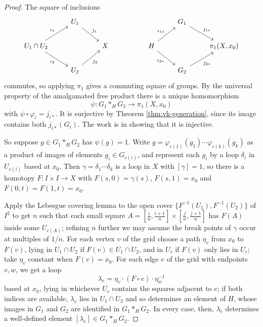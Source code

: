 \documentclass[a4paper]{scrartcl}
\begin{document}
\begin{proof}
	The square of inclusions
	\[\begin{tikzcd}
		& {U_1} \arrow[rd, "{j_1}"] & & & & {G_1} \arrow[rd, "{j_{1*}}"] & \\
		{U_1\cap U_2} \arrow[ru, "{\iota_1}"] \arrow[rd, "{\iota_2}"'] & & X & & H \arrow[ru, "{\iota_{1*}}"] \arrow[rd, "{\iota_{2*}}"'] & & {\pi_1(X,x_0)} \\
		& {U_2} \arrow[ru, "{j_2}"'] & & & & {G_2} \arrow[ru, "{j_{2*}}"'] &
	\end{tikzcd}\]
	commutes, so applying $\pi_1$ gives a commuting square of groups. By the universal property of the amalgamated free product there is a unique homomorphism
	$$
	\psi: G_1 *_H G_2 \to \pi_1(X, x_0)
	$$
	with $\psi \circ \varphi_i = j_{i*}$. It is surjective by Theorem \ref{thm:vk-generation}, since its image contains both $j_{i*}(G_i)$. The work is in showing that it is injective.

	So suppose $g \in G_1 *_H G_2$ has $\psi(g) = 1$. Write $g = \varphi_{c(1)}(g_1)\cdots\varphi_{c(k)}(g_k)$ as a product of images of elements $g_i \in G_{c(i)}$, and represent each $g_i$ by a loop $\delta_i$ in $U_{c(i)}$ based at $x_0$. Then $\gamma = \delta_1 \cdots \delta_k$ is a loop in $X$ with $[\gamma] = 1$, so there is a homotopy $F: I \times I \to X$ with $F(s, 0) = \gamma(s)$, $F(s,1) = x_0$ and $F(0,t) = F(1,t) = x_0$.

	Apply the Lebesgue covering lemma to the open cover $\{F^{-1}(U_1), F^{-1}(U_2)\}$ of $I^2$ to get $n$ such that each small square $A = [\frac{i}{n},\frac{i+1}{n}]\times[\frac{j}{n},\frac{j+1}{n}]$ has $F(A)$ inside some $U_{c(A)}$; refining $n$ further we may assume the break points of $\gamma$ occur at multiples of $1/n$. For each vertex $v$ of the grid choose a path $\eta_v$ from $x_0$ to $F(v)$, lying in $U_1 \cap U_2$ if $F(v) \in U_1\cap U_2$, and in $U_{c}$ if $F(v)$ only lies in $U_{c}$; take $\eta_v$ constant when $F(v) = x_0$. For each edge $e$ of the grid with endpoints $v, w$, we get a loop
	$$
	\lambda_e = \eta_v \cdot (F\circ e)\cdot \eta_w^{-1}
	$$
	based at $x_0$, lying in whichever $U_c$ contains the squares adjacent to $e$; if both indices are available, $\lambda_e$ lies in $U_1 \cap U_2$ and so determines an element of $H$, whose images in $G_1$ and $G_2$ are identified in $G_1 *_H G_2$. In every case, then, $\lambda_e$ determines a well-defined element $[\lambda_e] \in G_1 *_H G_2$.


\end{proof}
\end{document}
